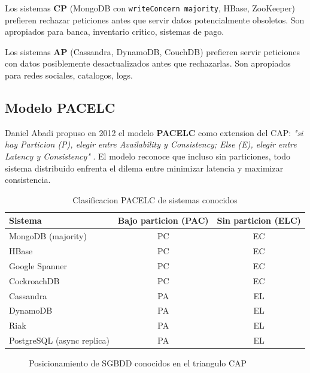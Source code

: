\documentclass[11pt,a4paper]{article}
\begin{document}
Los sistemas \textbf{CP} (MongoDB con \texttt{writeConcern majority}, HBase, ZooKeeper) prefieren rechazar peticiones antes que servir datos potencialmente obsoletos. Son apropiados para banca, inventario critico, sistemas de pago.

Los sistemas \textbf{AP} (Cassandra, DynamoDB, CouchDB) prefieren servir peticiones con datos posiblemente desactualizados antes que rechazarlas. Son apropiados para redes sociales, catalogos, logs.

\subsection{Modelo PACELC}

Daniel Abadi propuso en 2012 el modelo \textbf{PACELC} como extension del CAP: \emph{"si hay Particion (P), elegir entre Availability y Consistency; Else (E), elegir entre Latency y Consistency"} \cite{abadi2012}. El modelo reconoce que incluso sin particiones, todo sistema distribuido enfrenta el dilema entre minimizar latencia y maximizar consistencia.

\begin{table}[H]
\centering
\caption{Clasificacion PACELC de sistemas conocidos}
\small
\begin{tabular}{lcc}
\toprule
\textbf{Sistema} & \textbf{Bajo particion (PAC)} & \textbf{Sin particion (ELC)} \\
\midrule
MongoDB (majority) & PC & EC \\
HBase & PC & EC \\
Google Spanner & PC & EC \\
CockroachDB & PC & EC \\
Cassandra & PA & EL \\
DynamoDB & PA & EL \\
Riak & PA & EL \\
PostgreSQL (async replica) & PA & EL \\
\bottomrule
\end{tabular}
\label{tab:pacelc}
\end{table}

\begin{figure}[H]
\centering
{}
\caption{Posicionamiento de SGBDD conocidos en el triangulo CAP}
\end{figure}
\end{document}
